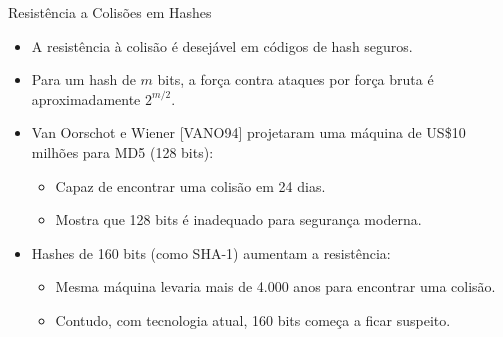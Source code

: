 \begin{frame}{Resistência a Colisões em Hashes}
    \begin{itemize}
        \item A resistência à colisão é desejável em códigos de hash seguros.
        \item Para um hash de $m$ bits, a força contra ataques por força bruta é aproximadamente $2^{m/2}$.
        \item Van Oorschot e Wiener [VANO94] projetaram uma máquina de US\$10 milhões para MD5 (128 bits):
            \begin{itemize}
                \item Capaz de encontrar uma colisão em 24 dias.
                \item Mostra que 128 bits é inadequado para segurança moderna.
            \end{itemize}
        \item Hashes de 160 bits (como SHA-1) aumentam a resistência:
            \begin{itemize}
                \item Mesma máquina levaria mais de 4.000 anos para encontrar uma colisão.
                \item Contudo, com tecnologia atual, 160 bits começa a ficar suspeito.
            \end{itemize}
        
    \end{itemize}
\end{frame}

